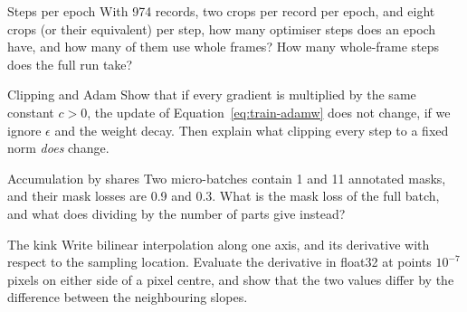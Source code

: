 \begin{exercise}{Steps per epoch}
With 974 records, two crops per record per epoch, and eight crops (or their equivalent) per step, how
many optimiser steps does an epoch have, and how many of them use whole frames? How many whole-frame
steps does the full run take?
\end{exercise}

\begin{exercise}{Clipping and Adam}
Show that if every gradient is multiplied by the same constant $c>0$, the update of
Equation~\eqref{eq:train-adamw} does not change, if we ignore $\epsilon$ and the weight decay. Then
explain what clipping every step to a fixed norm \emph{does} change.
\end{exercise}

\begin{exercise}{Accumulation by shares}
Two micro-batches contain 1 and 11 annotated masks, and their mask losses are 0.9 and 0.3. What is the
mask loss of the full batch, and what does dividing by the number of parts give instead?
\end{exercise}

\begin{exercise}{The kink}
Write bilinear interpolation along one axis, and its derivative with respect to the sampling location.
Evaluate the derivative in float32 at points $10^{-7}$ pixels on either side of a pixel centre, and
show that the two values differ by the difference between the neighbouring slopes.
\end{exercise}
